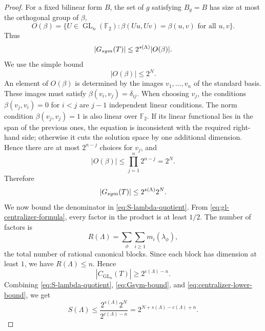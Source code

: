 \documentclass[10pt,a4paper]{amsart}
\newcommand{\F}{\mathbb F}
\newcommand{\GL}{\operatorname{GL}}
\begin{document}
\begin{proof}
For a fixed bilinear form $B$, the set of $g$ satisfying $B_g=B$ has size at most the orthogonal group of $\beta$,
\[
        O(\beta)=\{U\in\GL_n(\F_2):\beta(Uu,Uv)=\beta(u,v)\text{ for all }u,v\}.
\]
Thus
\[
        |G_{\rm sym}(T)|\leq 2^{s(\Lambda)}|O(\beta)|.
\]
We use the simple bound
\begin{equation}\label{eq:orthogonal-bound}
        |O(\beta)|\leq 2^N.
\end{equation}
An element of $O(\beta)$ is determined by the images $v_1,\ldots,v_n$ of the standard basis.  These images must satisfy $\beta(v_i,v_j)=\delta_{ij}$.  When choosing $v_j$, the conditions $\beta(v_j,v_i)=0$ for $i<j$ are $j-1$ independent linear conditions.  The norm condition $\beta(v_j,v_j)=1$ is also linear over $\F_2$.  If its linear functional lies in the span of the previous ones, the equation is inconsistent with the required right-hand side; otherwise it cuts the solution space by one additional dimension.  Hence there are at most $2^{n-j}$ choices for $v_j$, and
\[
        |O(\beta)|\leq\prod_{j=1}^n2^{n-j}=2^N.
\]
Therefore
\begin{equation}\label{eq:Gsym-bound}
        |G_{\rm sym}(T)|\leq 2^{s(\Lambda)}2^N.
\end{equation}
We now bound the denominator in \eqref{eq:S-lambda-quotient}.  From \eqref{eq:gl-centralizer-formula}, every factor in the product is at least $1/2$.  The number of factors is
\[
        R(\Lambda)=\sum_\phi\sum_{i\geq1}m_i(\lambda_\phi),
\]
the total number of rational canonical blocks.  Since each block has dimension at least $1$, we have $R(\Lambda)\leq n$.  Hence
\begin{equation}\label{eq:centralizer-lower-bound}
        |C_{\GL_n}(T)|\geq 2^{c(\Lambda)-n}.
\end{equation}
Combining \eqref{eq:S-lambda-quotient}, \eqref{eq:Gsym-bound}, and \eqref{eq:centralizer-lower-bound}, we get
\[
        S(\Lambda)
        \leq \frac{2^{s(\Lambda)}2^N}{2^{c(\Lambda)-n}}
        =2^{N+s(\Lambda)-c(\Lambda)+n}.
\]
\end{proof}
\end{document}

